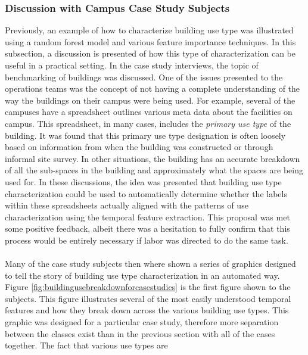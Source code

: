 \subsubsection{Discussion with Campus Case Study Subjects}
\label{sec:buildinguseclassificationdiscussion}

Previously, an example of how to characterize building use type was illustrated using a random forest model and various feature importance techniques. In this subsection, a discussion is presented of how this type of characterization can be useful in a practical setting. In the case study interviews, the topic of benchmarking of buildings was discussed. One of the issues presented to the operations teams was the concept of not having a complete understanding of the way the buildings on their campus were being used. For example, several of the campuses have a spreadsheet outlines various meta data about the facilities on campus. This spreadsheet, in many cases, includes the \emph{primary use type} of the building. It was found that this primary use type designation is often loosely based on information from when the building was constructed or through informal site survey. In other situations, the building has an accurate breakdown of all the sub-spaces in the building and approximately what the spaces are being used for. In these discussions, the idea was presented that building use type characterization could be used to automatically determine whether the labels within these spreadsheets actually aligned with the patterns of use characterization using the temporal feature extraction. This proposal was met some positive feedback, albeit there was a hesitation to fully confirm that this process would be entirely necessary if labor was directed to do the same task.\\
\\
Many of the case study subjects then where shown a series of graphics designed to tell the story of building use type characterization in an automated way. Figure \ref{fig:buildingusebreakdownforcasestudies} is the first figure shown to the subjects. This figure illustrates several of the most easily understood temporal features and how they break down across the various building use types. This graphic was designed for a particular case study, therefore more separation between the classes exist than in the previous section with all of the cases together. The fact that various use types are


